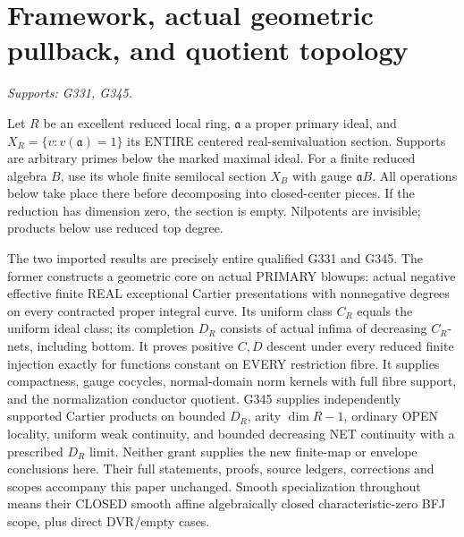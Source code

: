 \section{Framework, actual geometric pullback, and quotient topology}
\textit{Supports: G331, G345.}

Let $R$ be an excellent reduced local ring, $\mathfrak a$ a proper primary ideal, and $X_R=\{v:v(\mathfrak a)=1\}$ its ENTIRE centered real-semivaluation section. Supports are arbitrary primes below the marked maximal ideal. For a finite reduced algebra $B$, use its whole finite semilocal section $X_B$ with gauge $\mathfrak aB$. All operations below take place there before decomposing into closed-center pieces. If the reduction has dimension zero, the section is empty. Nilpotents are invisible; products below use reduced top degree.

The two imported results are precisely entire qualified G331 and G345. The former constructs a geometric core on actual PRIMARY blowups: actual negative effective finite REAL exceptional Cartier presentations with nonnegative degrees on every contracted proper integral curve. Its uniform class $C_R$ equals the uniform ideal class; its completion $D_R$ consists of actual infima of decreasing $C_R$-nets, including bottom. It proves positive $C,D$ descent under every reduced finite injection exactly for functions constant on EVERY restriction fibre. It supplies compactness, gauge cocycles, normal-domain norm kernels with full fibre support, and the normalization conductor quotient. G345 supplies independently supported Cartier products on bounded $D_R$, arity $\dim R-1$, ordinary OPEN locality, uniform weak continuity, and bounded decreasing NET continuity with a prescribed $D_R$ limit. Neither grant supplies the new finite-map or envelope conclusions here. Their full statements, proofs, source ledgers, corrections and scopes accompany this paper unchanged. Smooth specialization throughout means their CLOSED smooth affine algebraically closed characteristic-zero BFJ scope, plus direct DVR/empty cases.

